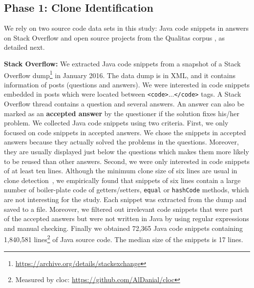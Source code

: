 \documentclass[10pt,journal,compsoc]{IEEEtran}
\begin{document}
\subsection{Phase 1: Clone Identification}

We rely on two source code data sets in this study: Java code snippets in answers
on Stack Overflow and open source projects from the Qualitas corpus
\cite{QualitasCorpus}, as detailed next.

\textbf{Stack Overflow:} We extracted Java code snippets from a snapshot of a
Stack Overflow dump\footnote{\url{https://archive.org/details/stackexchange}} in
January 2016. %
The data dump is in XML, and it contains information of posts (questions and
answers). We were interested in code snippets embedded in posts which were
located between {\small\texttt{<code>}...\texttt{</code>}} tags. A Stack
Overflow thread contains a question and several answers. An answer can also be
marked as an \textbf{accepted answer} by the questioner if the solution fixes
his/her problem. We collected Java code snippets using two criteria. First, we
only focused on code snippets in accepted answers. We chose the snippets in
accepted answers because they actually solved the problems in the questions.
Moreover, they are usually displayed just below the questions which makes them
more likely to be reused than other answers. Second, we were only interested in
code snippets of at least ten lines. Although the minimum clone size of six
lines are usual in clone detection~\cite{Bellon2007,Wang2013,Koschke2006}, we
empirically found that snippets of six lines contain a large number of
boiler-plate code of getters/setters, \texttt{equal} or \texttt{hashCode}
methods, which are not interesting for the study. Each snippet was extracted
from the dump and saved to a file. Moreover, we filtered out irrelevant code
snippets that were part of the accepted answers but were not written in Java by
using regular expressions and manual checking.
Finally we obtained 72,365 Java code snippets containing 1,840,581
lines\footnote{Measured by cloc: \url{https://github.com/AlDanial/cloc}} of Java
source code. The median size of the snippets is 17 lines.
\end{document}
